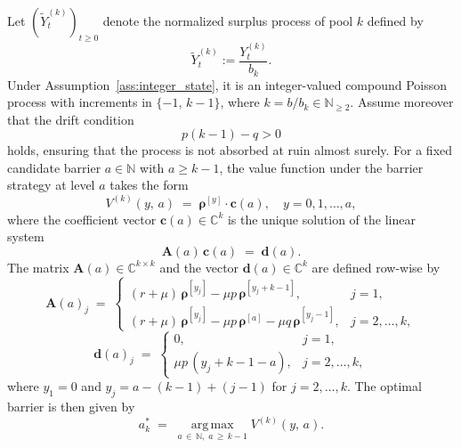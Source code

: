 \begin{prop}\label{prop:optimal_barrier}
Let $(\widetilde Y_t^{(k)})_{t \geq 0}$ denote the normalized surplus process of pool $k$ defined by
\[
\widetilde Y_t^{(k)} := \frac{Y_t^{(k)}}{b_k}.
\]
Under Assumption~\ref{ass:integer_state}, it is an integer-valued compound Poisson process with increments in $\{-1,\, k-1\}$, where $k = b/b_k \in \mathbb{N}_{\geq 2}$. Assume
moreover that the drift condition
\begin{equation}\label{eq:drift_condition}
    p(k-1) - q > 0
\end{equation}
holds, ensuring that the process is not absorbed at ruin almost surely. For a fixed
candidate barrier $a \in \mathbb{N}$ with $a \geq k - 1$, the value function under
the barrier strategy at level $a$ takes the form
\begin{equation}\label{eq:value_function_form}
    V^{(k)}(y,\, a) \;=\; \bm{\rho}^{[y]} \cdot \mathbf{c}(a), \quad y = 0, 1, \dots, a,
\end{equation}
where the coefficient vector $\mathbf{c}(a) \in \mathbb{C}^k$ is the unique solution of the
linear system
\begin{equation}\label{eq:linear_system}
    \mathbf{A}(a)\,\mathbf{c}(a) \;=\; \mathbf{d}(a).
\end{equation}
The matrix $\mathbf{A}(a) \in \mathbb{C}^{k \times k}$ and the vector
$\mathbf{d}(a) \in \mathbb{C}^{k}$ are defined row-wise by
\begin{equation}\label{eq:A_matrix}
    \mathbf{A}(a)_j \;=\;
    \begin{cases}
        (r+\mu)\,\bm{\rho}^{[y_j]} - \mu p\,\bm{\rho}^{[y_j + k - 1]},
        & j = 1, \\[0.6em]
        (r+\mu)\,\bm{\rho}^{[y_j]} - \mu p\,\bm{\rho}^{[a]}
        - \mu q\,\bm{\rho}^{[y_j - 1]},
        & j = 2, \dots, k,
    \end{cases}
\end{equation}
\begin{equation}\label{eq:d_vector}
    \mathbf{d}(a)_j \;=\;
    \begin{cases}
        0,
        & j = 1, \\[0.6em]
        \mu p\,(y_j + k - 1 - a),
        & j = 2, \dots, k,
    \end{cases}
\end{equation}
where $y_1 = 0$ and $y_j = a - (k-1) + (j-1)$ for $j = 2, \dots, k$.
The optimal barrier is then given by
\begin{equation}\label{eq:optimal_barrier}
    a_k^* \;=\; \operatorname*{arg\,max}_{a \,\in\, \mathbb{N},\; a \,\geq\, k-1}
    V^{(k)}(y,\, a).
\end{equation}
\end{prop}

